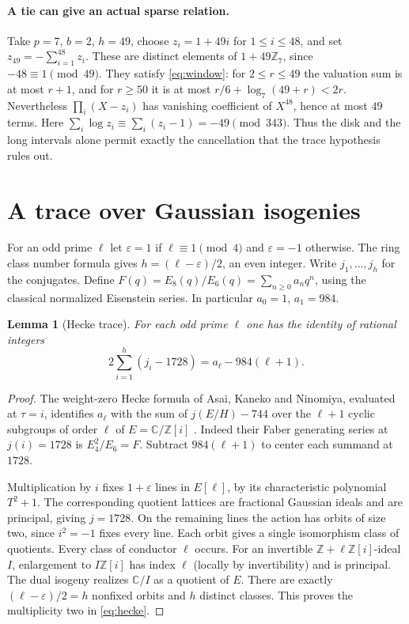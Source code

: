 \documentclass[11pt]{article}
\newtheorem{lemma}[theorem]{Lemma}
\newcommand{\Z}{\mathbb Z}
\begin{document}
\paragraph{A tie can give an actual sparse relation.}
Take $p=7$, $b=2$, $h=49$, choose $z_i=1+49i$ for $1\le i\le48$, and set $z_{49}=-\sum_{i=1}^{48}z_i$. These are distinct elements of $1+49\Z_7$, since $-48\equiv1\pmod{49}$. They satisfy \eqref{eq:window}: for $2\le r\le49$ the valuation sum is at most $r+1$, and for $r\ge50$ it is at most $r/6+\log_7(49+r)<2r$. Nevertheless $\prod_i(X-z_i)$ has vanishing coefficient of $X^{48}$, hence at most $49$ terms. Here $\sum_i\log z_i\equiv\sum_i(z_i-1)=-49\pmod{343}$. Thus the disk and the long intervals alone permit exactly the cancellation that the trace hypothesis rules out.

\section{A trace over Gaussian isogenies}
For an odd prime $\ell$ let $\varepsilon=1$ if $\ell\equiv1\pmod4$ and $\varepsilon=-1$ otherwise. The ring class number formula gives $h=(\ell-\varepsilon)/2$, an even integer. Write $j_1,\ldots,j_h$ for the conjugates. Define $F(q)=E_8(q)/E_6(q)=\sum_{n\ge0}a_nq^n$, using the classical normalized Eisenstein series. In particular $a_0=1$, $a_1=984$.

\begin{lemma}[Hecke trace]\label{lem:hecke}
For each odd prime $\ell$ one has the identity of rational integers
\begin{equation}\label{eq:hecke}
       2\sum_{i=1}^h(j_i-1728)=a_\ell-984(\ell+1).
\end{equation}
\end{lemma}
\begin{proof}
The weight-zero Hecke formula of Asai, Kaneko and Ninomiya, evaluated at $\tau=i$, identifies $a_\ell$ with the sum of $j(E/H)-744$ over the $\ell+1$ cyclic subgroups of order $\ell$ of $E=\mathbb C/\Z[i]$ \cite[eq.~(5), Cor.~4]{akn}. Indeed their Faber generating series at $j(i)=1728$ is $E_4^2/E_6=F$. Subtract $984(\ell+1)$ to center each summand at $1728$.

Multiplication by $i$ fixes $1+\varepsilon$ lines in $E[\ell]$, by its characteristic polynomial $T^2+1$. The corresponding quotient lattices are fractional Gaussian ideals and are principal, giving $j=1728$. On the remaining lines the action has orbits of size two, since $i^2=-1$ fixes every line. Each orbit gives a single isomorphism class of quotients. Every class of conductor $\ell$ occurs. For an invertible $\Z+\ell\Z[i]$-ideal $I$, enlargement to $I\Z[i]$ has index $\ell$ (locally by invertibility) and is principal. The dual isogeny realizes $\mathbb C/I$ as a quotient of $E$. There are exactly $(\ell-\varepsilon)/2=h$ nonfixed orbits and $h$ distinct classes. This proves the multiplicity two in \eqref{eq:hecke}.
\end{proof}
\end{document}
